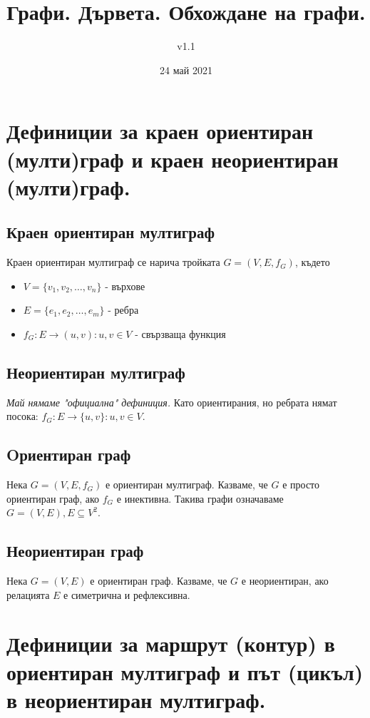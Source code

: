 \documentclass[fleqn,12pt]{article}
\title{Графи. Дървета. Обхождане на графи.}
\author{v1.1}
\date{24 май 2021}
\begin{document}
\maketitle

\tableofcontents

\begin{flushleft}

\section{Дефиниции за краен ориентиран (мулти)граф и краен неориентиран (мулти)граф.}
\subsection{Краен ориентиран мултиграф}
Краен ориентиран мултиграф се нарича тройката $G = (V, E, f_G)$, където
\begin{itemize}
	\item $V = \{ v_1, v_2, \dots, v_n \}$ - върхове
	\item $E = \{ e_1, e_2, \dots, e_m \}$ - ребра
	\item $f_G : E \rightarrow (u,v) : u,v \in V$ - свързваща функция
\end{itemize}

\subsection{Неориентиран мултиграф}
\textit{Май нямаме "официална" дефиниция. } Като ориентирания, но ребрата нямат посока: $f_G : E \rightarrow \{u,v\} : u,v \in V$.

\subsection{Oриентиран граф}
Нека $G = (V, E, f_G)$ е ориентиран мултиграф. Казваме, че $G$ е просто ориентиран граф, ако $f_G$ е инективна. 
Такива графи означаваме $G = (V, E), E \subseteq V^2$.

\subsection{Неориентиран граф}
Нека $G = (V, E)$ е ориентиран граф. Казваме, че $G$ е неориентиран, ако релацията $E$ е симетрична и рефлексивна.

\section{Дефиниции за маршрут (контур) в ориентиран мултиграф и път (цикъл) в неориентиран мултиграф.}

\end{flushleft}
\end{document}
